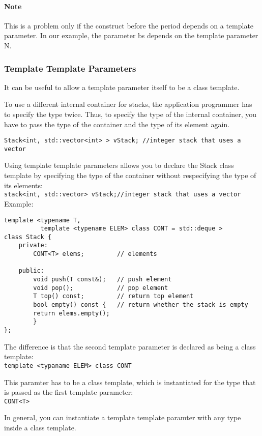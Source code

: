 \documentclass[a4paper,12pt]{book}
\begin{document}
\paragraph{Note} This is a problem only if the construct before the period depends on a template parameter. In our example, the parameter bs depends on the template parameter N.
\subsubsection{Template Template Parameters}
It can be useful to allow a template parameter itself to be a class template. 

To use a different internal container for stacks, the application programmer has to specify the type twice. Thus, to specify the type of the internal container, you have to pass the type of the container and the type of its element again.
\begin{verbatim}
Stack<int, std::vector<int> > vStack; //integer stack that uses a vector
\end{verbatim}

Using template template parameters allows you to declare the Stack class template by specifying the type of the container without respecifying the type of its elements:\\
\verb|stack<int, std::vector> vStack;//integer stack that uses a vector|
Example:
\begin{verbatim}
template <typename T, 
          template <typename ELEM> class CONT = std::deque > 
class Stack { 
    private: 
        CONT<T> elems;         // elements 

    public: 
        void push(T const&);   // push element 
        void pop();            // pop element 
        T top() const;         // return top element 
        bool empty() const {   // return whether the stack is empty 
        return elems.empty(); 
        } 
}; 
\end{verbatim}

The difference is that the second template parameter is declared as being a class template:\\
\verb|template <typaname ELEM> class CONT|

This paramter has to be a class template, which is instantiated for the type that is passed as the first template parameter:\\
\verb|CONT<T>|

In general, you can instantiate a template template paramter with any type inside a class template.
\end{document}
